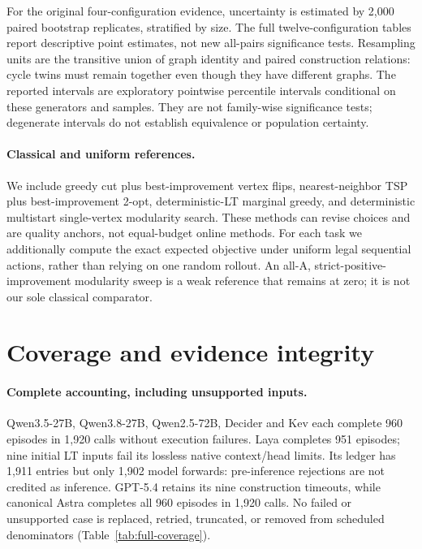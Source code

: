 For the original four-configuration evidence, uncertainty is estimated by
2,000 paired bootstrap replicates, stratified by size.
The full twelve-configuration tables report descriptive point estimates, not
new all-pairs significance tests.
Resampling units are the transitive union of graph identity and paired
construction relations: cycle twins must remain together even though they
have different graphs. The reported intervals are exploratory pointwise
percentile intervals conditional on these generators and samples. They are
not family-wise significance tests; degenerate intervals do not establish
equivalence or population certainty.

\paragraph{Classical and uniform references.}
We include greedy cut plus best-improvement vertex flips, nearest-neighbor
TSP plus best-improvement 2-opt, deterministic-LT marginal greedy, and
deterministic multistart single-vertex modularity search. These methods can
revise choices and are quality anchors, not equal-budget online methods.
For each task we additionally compute the exact expected objective under
uniform legal sequential actions, rather than relying on one random rollout.
An all-A, strict-positive-improvement modularity sweep is a weak reference
that remains at zero; it is not our sole classical comparator.

\section{Coverage and evidence integrity}
\label{app:coverage-integrity}


\paragraph{Complete accounting, including unsupported inputs.}
Qwen3.5-27B, Qwen3.8-27B, Qwen2.5-72B, Decider and Kev each complete
960 episodes in 1,920 calls without
execution failures. Laya completes 951 episodes; nine initial LT inputs fail
its lossless native context/head limits. Its ledger has 1,911 entries but
only 1,902 model forwards: pre-inference rejections are not credited as
inference. GPT-5.4 retains its nine construction timeouts, while canonical
Astra completes all 960 episodes in 1,920 calls. No failed or unsupported case
is replaced, retried, truncated, or removed from scheduled denominators
(Table~\ref{tab:full-coverage}).


